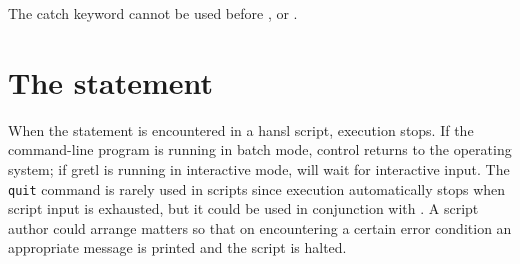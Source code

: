 The catch keyword cannot be used before ,  or
.


\section{The  statement}

When the  statement is encountered in a hansl script,
execution stops. If the command-line program  is running
in batch mode, control returns to the operating system; if gretl is
running in interactive mode,  will wait for interactive
input. The \texttt{quit} command is rarely used in scripts since
execution automatically stops when script input is exhausted, but it
could be used in conjunction with . A script author could
arrange matters so that on encountering a certain error condition an
appropriate message is printed and the script is halted.

